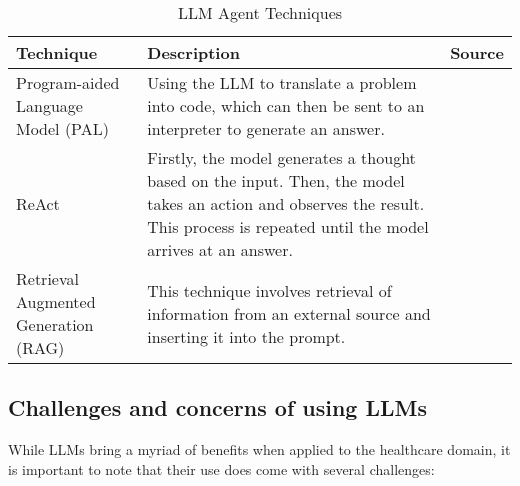 \begin{table}[h!]
    \centering
    \begin{tabular}{p{3cm} p{8cm} p{2cm}}
        \toprule
        \textbf{Technique} & \textbf{Description} & \textbf{Source} \\
        \midrule
        \raggedright
        Program-aided Language Model (PAL) & Using the LLM to translate a problem into code, which can then be sent to an interpreter to generate an answer. & \textcite{pal} \\
        \hline
        \raggedright
        ReAct & Firstly, the model generates a thought based on the input. Then, the model takes an action and observes the result. This process is repeated until the model arrives at an answer. & \textcite{react-llm} \\
        \hline
        \raggedright
        Retrieval Augmented Generation (RAG) & This technique involves retrieval of information from an external source and inserting it into the prompt. & \textcite{rag} \\
        \bottomrule
    \end{tabular}
    \caption{LLM Agent Techniques}
    \label{tab:agents}
\end{table}

\FloatBarrier

\subsection{Challenges and concerns of using LLMs}

While LLMs bring a myriad of benefits when applied to the healthcare domain, it is important to note that their use does come with several challenges:

